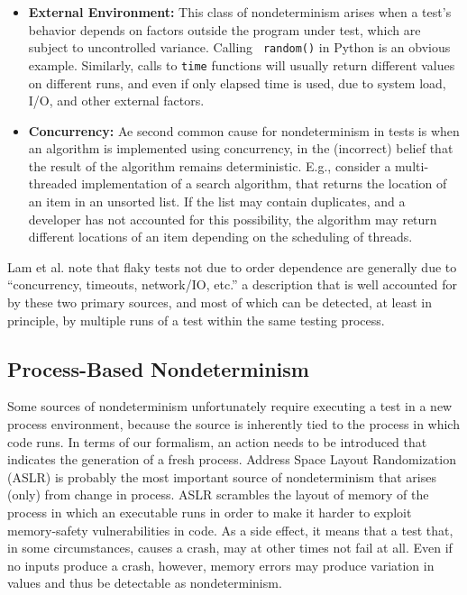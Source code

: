 \begin{itemize}
\item {\bf External Environment:} This class of nondeterminism arises
  when a test's behavior depends on factors outside the program under
  test, which are subject to uncontrolled variance.  Calling {\tt
    random()} in Python is an obvious example. Similarly, calls to {\tt time}
  functions  will usually return different values on different runs,
  and even if only elapsed time is used, due to system load, I/O, and
  other external factors.
\item {\bf Concurrency:} Ae second common cause for
  nondeterminism in tests is when an algorithm is implemented using
  concurrency, in the (incorrect) belief that the result of the
  algorithm remains deterministic.  E.g., consider a multi-threaded
  implementation of a search algorithm, that returns the location of
  an item in an unsorted list.  If the list may contain duplicates,
  and a developer has not accounted for this possibility, the
  algorithm may return different locations of an item
  depending on the scheduling of threads.
\end{itemize}

Lam et al. \cite{idflakies} note that flaky tests not due to order
dependence are generally due to ``concurrency, timeouts,
network/IO, etc.'' a description that is well accounted for by these two
primary sources, and most of which can be detected, at least in
principle, by multiple runs of a test within the same testing process.  %

\subsection{Process-Based Nondeterminism}

\label{sec:pnondet}

Some sources of nondeterminism unfortunately require executing a test in a new
process environment, because the source is inherently tied to the
process in which code runs.  In terms of our formalism, an
action needs to be introduced that indicates the generation of a fresh
process.  Address Space Layout Randomization (ASLR) \cite{ASLR}  is probably the most
important source of nondeterminism that arises (only) from change in
process.  ASLR scrambles the layout of memory of the process in which
an executable runs in order to make it harder to exploit memory-safety
vulnerabilities in code.  As a side effect, it
means that a test that, in some circumstances, causes a crash, may at
other times not fail at all.  Even if no inputs produce a crash,
however, memory errors may produce variation in values and thus be detectable
as nondeterminism.

